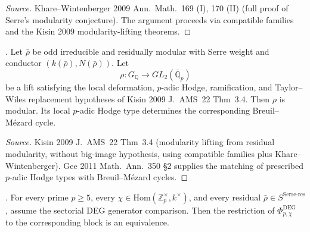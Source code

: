 \begin{proof}[Source]
Khare--Wintenberger 2009 Ann.~Math.~169 (I), 170 (II) (full proof
of Serre's modularity conjecture). The argument proceeds via
compatible families and the Kisin 2009 modularity-lifting theorems.
\end{proof}

\begin{lemma}
\label{v4-arith:w6-e:lem:Kisin-lifting}
\ClaimStatusProvedElsewhere. Let \(\bar\rho\) be odd irreducible and
residually modular with Serre weight and conductor
\((k(\bar\rho), N(\bar\rho))\). Let
\[
\rho\colon G_{\mathbb{Q}}\to GL_{2}(\overline{\mathbb{Q}}_{p})
\]
be a lift satisfying the local deformation, \(p\)-adic Hodge,
ramification, and Taylor--Wiles replacement hypotheses of Kisin 2009
J.~AMS~22 Thm~3.4. Then \(\rho\) is modular. Its local \(p\)-adic Hodge
type determines the corresponding Breuil--M{\'e}zard cycle.
\end{lemma}

\begin{proof}[Source]
Kisin 2009 J.~AMS~22 Thm~3.4 (modularity lifting from residual
modularity, without big-image hypothesis, using compatible families
plus Khare--Wintenberger). Gee 2011 Math.~Ann.~350 \S 2 supplies the
matching of prescribed \(p\)-adic Hodge types with Breuil--M{\'e}zard
cycles.
\end{proof}

\begin{theorem}
\label{v4-arith:w6-e:thm:TW-removal-Serre}
\ClaimStatusNeedsVerification. For every prime \(p\geq 5\), every
\(\chi\in\mathrm{Hom}(\mathbb{Z}_{p}^{\times},k^{\times})\), and every
residual \(\bar\rho\in S^{\mathrm{Serre\text{-}res}}\), assume the
sectorial DEG generator comparison. Then the
restriction of \(\Phi^{\mathrm{DEG}}_{p,\chi}\) to the corresponding
block is an equivalence.
\end{theorem}

